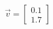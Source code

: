 \documentclass[preview]{standalone}
\begin{document}
\begin{align*}
\vec{v}=\begin{bmatrix}0.1\\1.7\end{bmatrix}
\end{align*}
\end{document}
